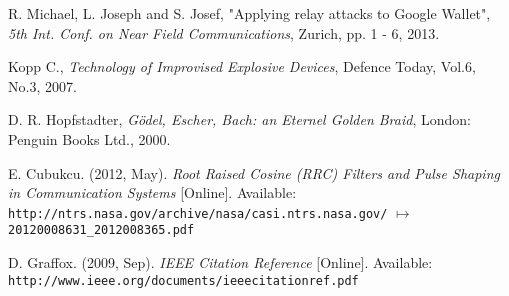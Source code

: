 \begin{thebibliography}{99}
\bibitem{[9]}
R. Michael, L. Joseph and S. Josef, "Applying relay attacks to Google Wallet", \emph{5th Int. Conf. on Near Field Communications}, Zurich, pp. 1 - 6, 2013.

\bibitem{[10]}
Kopp C., \emph{Technology of Improvised Explosive Devices}, Defence Today, Vol.6, No.3, 2007.

\bibitem{[11]}
D. R. Hopfstadter, \emph{G\"{o}del, Escher, Bach: an Eternel Golden Braid}, London: Penguin Books Ltd., 2000.

\bibitem{[12]}
E. Cubukcu. (2012, May). \emph{Root Raised Cosine (RRC) Filters and Pulse Shaping in Communication Systems} [Online]. Available: \newline \texttt{http://ntrs.nasa.gov/archive/nasa/casi.ntrs.nasa.gov/} \newline
$\mapsto$ \texttt{20120008631\_2012008365.pdf}

\bibitem{[20]}
D. Graffox. (2009, Sep). \emph{IEEE Citation Reference} [Online]. Available: \texttt{http://www.ieee.org/documents/ieeecitationref.pdf}

\end{thebibliography}